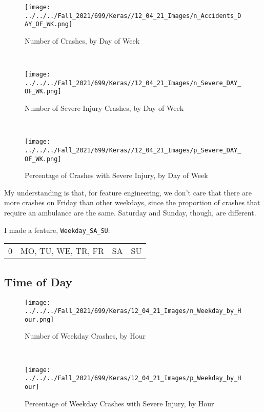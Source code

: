 \begin{figure}[h!]
\centering
\begin{minipage}{.27\textwidth}
  \centering
  \texttt{[image: ../../../Fall\_2021/699/Keras//12\_04\_21\_Images/n\_Accidents\_DAY\_OF\_WK.png]}
  \caption{Number of Crashes, by Day of Week}
  \label{fig:test1}
\end{minipage}%
\begin{minipage}{0.05\textwidth}
\
\end{minipage}
\begin{minipage}{.27\textwidth}
  \centering
  \texttt{[image: ../../../Fall\_2021/699/Keras//12\_04\_21\_Images/n\_Severe\_DAY\_OF\_WK.png]}
  \caption{Number of Severe Injury Crashes, by Day of Week}
  \label{fig:test2}
\end{minipage}
\begin{minipage}{0.05\textwidth}
\
\end{minipage}
\begin{minipage}{.27\textwidth}
  \centering
  \texttt{[image: ../../../Fall\_2021/699/Keras//12\_04\_21\_Images/p\_Severe\_DAY\_OF\_WK.png]}
  \caption{Percentage of Crashes with Severe Injury, by Day of Week}
  \label{fig:test2}
\end{minipage}
\end{figure}


My understanding is that, for feature engineering, we don't care that there are more crashes on Friday than other weekdays, since the proportion of crashes that require an ambulance are the same.  Saturday and Sunday, though, are different.

I made a feature, \verb|Weekday_SA_SU|:

\begin{center}
\begin{tabular}{rl}
	0 & MO, TU, WE, TR, FR & SA  & SU \cr
\end{tabular}
\end{center}

\newpage
\subsection{Time of Day}

\begin{figure}[h!]
\centering
\begin{minipage}{.45\textwidth}
  \centering
  \texttt{[image: ../../../Fall\_2021/699/Keras/12\_04\_21\_Images/n\_Weekday\_by\_Hour.png]}
  \caption{Number of Weekday Crashes, by Hour}
  \label{fig:test1}
\end{minipage}%
\begin{minipage}{0.08\textwidth}
\
\end{minipage}
\begin{minipage}{.45\textwidth}
  \centering
  \texttt{[image: ../../../Fall\_2021/699/Keras/12\_04\_21\_Images/p\_Weekday\_by\_Hour]}
  \caption{Percentage of Weekday Crashes with Severe Injury, by Hour}
  \label{fig:test2}
\end{minipage}
\end{figure}

